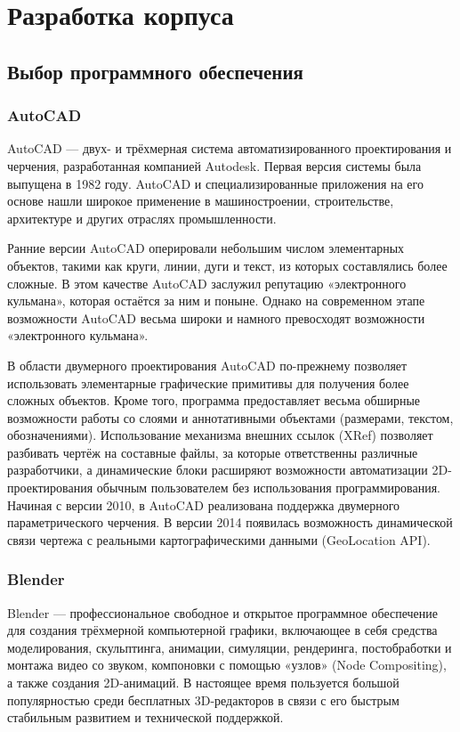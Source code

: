 \section{Разработка корпуса}
\label{sec:software}

\subsection{Выбор программного обеспечения}
\subsubsection{AutoCAD}
AutoCAD — двух- и трёхмерная система автоматизированного проектирования и черчения, разработанная компанией Autodesk. Первая версия системы была выпущена в 1982 году. AutoCAD и специализированные приложения на его основе нашли широкое применение в машиностроении, строительстве, архитектуре и других отраслях промышленности.


Ранние версии AutoCAD оперировали небольшим числом элементарных объектов, такими как круги, линии, дуги и текст, из которых составлялись более сложные. В этом качестве AutoCAD заслужил репутацию «электронного кульмана», которая остаётся за ним и поныне. Однако на современном этапе возможности AutoCAD весьма широки и намного превосходят возможности «электронного кульмана».


В области двумерного проектирования AutoCAD по-прежнему позволяет использовать элементарные графические примитивы для получения более сложных объектов. Кроме того, программа предоставляет весьма обширные возможности работы со слоями и аннотативными объектами (размерами, текстом, обозначениями). Использование механизма внешних ссылок (XRef) позволяет разбивать чертёж на составные файлы, за которые ответственны различные разработчики, а динамические блоки расширяют возможности автоматизации 2D-проектирования обычным пользователем без использования программирования. Начиная с версии 2010, в AutoCAD реализована поддержка двумерного параметрического черчения. В версии 2014 появилась возможность динамической связи чертежа с реальными картографическими данными (GeoLocation API).

\subsubsection{Blender}

Blender — профессиональное свободное и открытое программное обеспечение для создания трёхмерной компьютерной графики, включающее в себя средства моделирования, скульптинга, анимации, симуляции, рендеринга, постобработки и монтажа видео со звуком, компоновки с помощью «узлов» (Node Compositing), а также создания 2D-анимаций. В настоящее время пользуется большой популярностью среди бесплатных 3D-редакторов в связи с его быстрым стабильным развитием и технической поддержкой.


